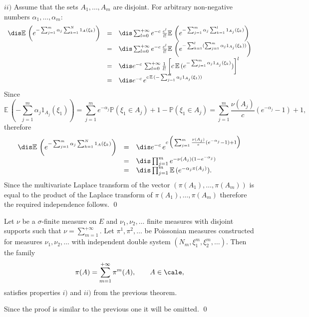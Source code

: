 \documentclass[preprint]{imsart}
\def\P{\mathbb P}
\def\E{\mathbb E}
\begin{document}
{$ii)$ Assume that the sets  $A_1,\ldots,A_m$ are disjoint. For
arbitrary non-negative numbers  $\alpha_1,\ldots,\alpha_m$:
$$\begin{array}{lll}\dis
\E\, \left(e^{-\sum_{j=1}^m\alpha_j \sum_{k=1}^N 1_A(\xi_k)}\right)
&=&\dis
\sum_{l=0}^{+\infty}
e^{-c}\, \frac{c^l}{l!}\E\, \left(
e^{-\sum_{j=1}^m\alpha_j \sum_{k=1}^l 1_{A_j}(\xi_k)}\right)
\\&=&\dis
\sum_{l=0}^{+\infty}
e^{-c}\, \frac{c^l}{l!}\E\, \left(
e^{-\sum_{k=1}^l(\sum_{j=1}^m\alpha_j  1_{A_j}(\xi_k))}\right)
\\&=&\dis
e^{-c}\,\sum_{l=0}^{+\infty} \frac{1}{l!}
 \left[c\,\E\,(
e^{-\sum_{j=1}^m\alpha_j  1_{A_j}(\xi_k)})\right]^l
\\&=&\dis
e^{-c}\,e^{c\,\E\,(
-\sum_{j=1}^m\alpha_j  1_{A_j}(\xi_1))}
\end{array}
$$
Since
$$
\E\,(
-\sum_{j=1}^m\alpha_j  1_{A_j}(\xi_1))
=
\sum_{j=1}^me^{-\alpha_j} \P (\xi_1\in A_j)+1- \P (\xi_1\in A_j)
=\sum_{j=1}^m \frac{\nu(A_j)}{c}(e^{-\alpha_j}-1)+1,
$$
therefore
$$\begin{array}{lll}\dis
\E\, \left(e^{-\sum_{j=1}^m\alpha_j \sum_{k=1}^N 1_A(\xi_k)}\right)
&=&\dis
e^{-c}\,e^{c\,\Big(
 \sum_{j=1}^m \frac{\nu(A_j)}{c}(e^{-\alpha_j}-1)+1
\Big)}
\\&=&\dis
\prod_{j=1}^m e^{-\nu(A_j)(1-e^{-\alpha_j})}
\\&=&\dis
\prod_{j=1}^m \E\, (e^{-\alpha_j\pi(A_j)}).
\end{array}
$$
Since the multivariate Laplace transform of the vector
$(\pi(A_1),\ldots,\pi(A_m))$ is equal to the product of the
Laplace transform of $\pi(A_1),\ldots,\pi(A_m)$ therefore the
required independence follows.
\qed


\begin{Theorem}\label{poissonrandommeasuredue}
Let $\nu$ be a $\sigma$-finite measure on $E$
and $\nu_1,\nu_2,\ldots$ finite measures with
disjoint supports  such that
$\nu=\sum_{m=1}^{+\infty}$. Let $\pi^1,\pi^2,\ldots$
be Poissonian measures constructed for measures
$\nu_1,\nu_2,\ldots$ with independent double system
$(N_m, \xi_1^m,\xi_2^m,\ldots)$. Then the family
  $$
  \pi(A)=\sum_{m=1}^{+\infty} \pi^m(A),
  \qquad A\in\cale,
  $$
  satisfies properties $i)$ and $ii)$ from the previous
  theorem.
\end{Theorem}

  Since the proof is similar to the previous
 one it will be omitted. \qed

}
\end{document}
